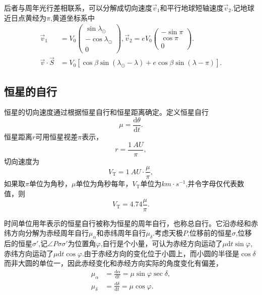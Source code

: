 \documentclass[11pt, a4paper, oneside]{ctexart}
\numberwithin{equation}{subsection}
\begin{document}
后者与周年光行差相联系，可以分解成切向速度$\vec v_1$和平行地球短轴速度$\vec v_2$.记地球近日点黄经为$\pi$,黄道坐标系中
\begin{align}
\vec v_1&=V_0\begin{pmatrix}
\sin\lambda_\odot\\
-\cos\lambda_\odot\\
0
\end{pmatrix},\vec v_2=eV_0\begin{pmatrix}
-\sin\pi\\
\cos\pi\\
0
\end{pmatrix}.\\
\vec v\cdot\vec S&=V_{0}\left[\cos\beta\sin\left(\lambda_\odot-\lambda\right)+e\cos\beta\sin\left(\lambda-\pi\right)\right].
\end{align}

\subsection{恒星的自行}
恒星的切向速度通过根据恒星自行和恒星距离确定。定义恒星自行
\begin{equation}
\mu=\frac{\mathrm{d}\theta}{\mathrm{d}t}.
\end{equation}
恒星距离$r$可用恒星视差$\pi$表示，
\begin{equation}
r=\frac{\qty{1}{AU}}{\pi},
\end{equation}
切向速度为
\begin{equation}
V_{\text{T}}=\qty{1}{AU}\cdot\frac{\mu}{\pi},
\end{equation}
如果取$\pi$单位为角秒，$\mu$单位为角秒每年，$V_\text{T}$单位为$\unit{km\cdot{}s^{-1}}$,并令字母仅代表数值，则
\begin{equation}
V_{\text{T}}=4.74\frac{\mu}{\pi}.
\end{equation}

时间单位用年表示的恒星自行被称为恒星的周年自行，也称总自行。它沿赤经和赤纬方向分解为赤经周年自行$\mu_\alpha$和赤纬周年自行$\mu_\delta$.考虑天极$P$,位移前的恒星$\sigma$,位移后的恒星$\sigma'$,记$\angle{P\sigma\sigma'}$为位置角$\varphi$,自行是个小量，可认为赤经方向运动了$\mu\mathrm{d}t\sin\varphi$,赤纬方向运动了$\mu\mathrm{d}t\cos\varphi$.由于赤经方向的变化位于小圆上，而小圆的半径是$\cos\delta{}$而非大圆的单位一，因此赤经变化和赤经方向实际的角度变化有偏差，
\begin{align}
\mu_{\alpha}&=\frac{\mathrm{d}\alpha}{\mathrm{d}t}=\mu\sin\varphi\sec\delta{},\label{6.1.4}\\
\mu_{\delta{}}&=\frac{\mathrm{d}\delta{}}{\mathrm{d}t}=\mu\cos\varphi.\label{6.1.5}
\end{align}
\end{document}
